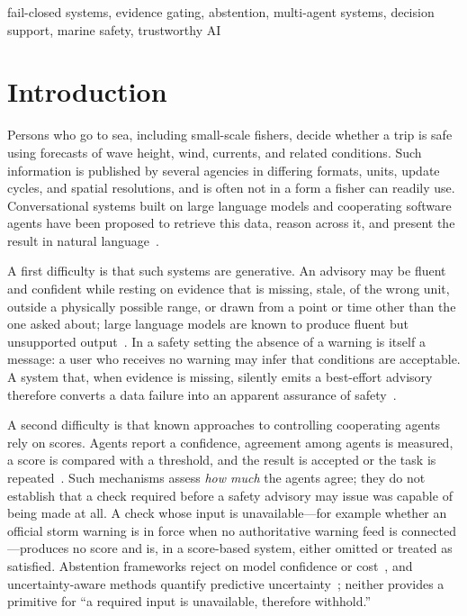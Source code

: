 \documentclass[conference]{IEEEtran}
\begin{document}
\begin{IEEEkeywords}
fail-closed systems, evidence gating, abstention, multi-agent systems, decision support, marine safety, trustworthy AI
\end{IEEEkeywords}

\section{Introduction}
Persons who go to sea, including small-scale fishers, decide whether a trip is safe using forecasts of wave height, wind, currents, and related conditions. Such information is published by several agencies in differing formats, units, update cycles, and spatial resolutions, and is often not in a form a fisher can readily use. Conversational systems built on large language models and cooperating software agents have been proposed to retrieve this data, reason across it, and present the result in natural language~\cite{wang2024survey,sun2025llm,guo2024multiagent}.

A first difficulty is that such systems are generative. An advisory may be fluent and confident while resting on evidence that is missing, stale, of the wrong unit, outside a physically possible range, or drawn from a point or time other than the one asked about; large language models are known to produce fluent but unsupported output~\cite{ji2023hallucination}. In a safety setting the absence of a warning is itself a message: a user who receives no warning may infer that conditions are acceptable. A system that, when evidence is missing, silently emits a best-effort advisory therefore converts a data failure into an apparent assurance of safety~\cite{varshney2017safety}.

A second difficulty is that known approaches to controlling cooperating agents rely on scores. Agents report a confidence, agreement among agents is measured, a score is compared with a threshold, and the result is accepted or the task is repeated~\cite{sun2025llm,guo2024multiagent}. Such mechanisms assess \emph{how much} the agents agree; they do not establish that a check required before a safety advisory may issue was capable of being made at all. A check whose input is unavailable---for example whether an official storm warning is in force when no authoritative warning feed is connected---produces no score and is, in a score-based system, either omitted or treated as satisfied. Abstention frameworks reject on model confidence or cost~\cite{hendrickx2024reject,angelopoulos2023conformal}, and uncertainty-aware methods quantify predictive uncertainty~\cite{gawlikowski2023uncertainty,hullermeier2021aleatoric}; neither provides a primitive for ``a required input is unavailable, therefore withhold.''
\end{document}
